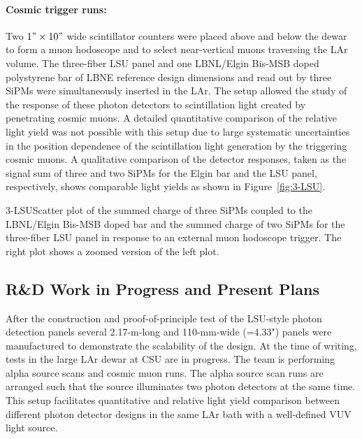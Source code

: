 \paragraph{Cosmic trigger runs:} Two $ 1" \times 10"$ wide scintillator counters were placed above and below the dewar to form a muon hodoscope and to select near-vertical muons traversing the LAr volume. The three-fiber LSU panel and one LBNL/Elgin Bis-MSB doped polystyrene bar of LBNE reference design dimensions and read out by three SiPMs were simultaneously inserted in the LAr. The setup allowed the study of the response of these photon detectors to scintillation light created by penetrating cosmic muons. A detailed quantitative comparison of the relative light yield was not possible with this setup due to large systematic uncertainties in the position dependence of the scintillation light generation by the triggering cosmic muons. A qualitative comparison of the detector responses, taken as the signal sum of three and two SiPMs for the Elgin bar and the LSU panel, respectively, shows comparable light yields as shown in Figure~\ref{fig:3-LSU}. 
        
%
%
\begin{cdrfigure}{3-LSU}{Scatter plot of the summed charge of three SiPMs coupled to the
 LBNL/Elgin Bis-MSB doped bar and the summed charge of two SiPMs for
 the three-fiber LSU panel in response to an external muon hodoscope
 trigger. The right plot shows a zoomed version of the left plot.}
\end{cdrfigure}

%

\subsection{R\&D Work in Progress and Present Plans }

After the construction and proof-of-principle test of the LSU-style
photon detection panels %
several 2.17-m-long and 110-mm-wide 
(=4.33") panels were manufactured to demonstrate the scalability of the design.  At
the time of writing, tests in the large LAr dewar at CSU are in
progress.  The team is performing alpha source scans and cosmic muon runs.
The alpha source scan runs are arranged such that the source
illuminates two photon detectors at the same time.  This setup
facilitates quantitative and relative light yield comparison between
different photon detector designs in the same LAr bath with a well-defined VUV light source.

